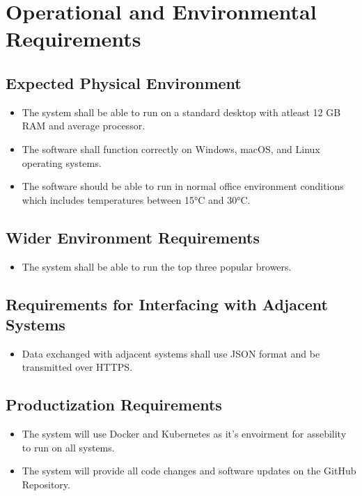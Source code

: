 \documentclass[12pt]{article}
\begin{document}
\section{Operational and Environmental Requirements}
\subsection{Expected Physical Environment}
\begin{itemize}
    \item The system shall be able to run on a standard desktop with atleast 12 GB RAM and average processor.
    \item The software shall function correctly on Windows, macOS, and Linux operating systems.
    \item The software should be able to run in normal office environment conditions which includes temperatures between 15°C and 30°C. 
\end{itemize}

\subsection{Wider Environment Requirements}

\begin{itemize}
    \item The system shall be able to run the top three popular browers.
\end{itemize}


\subsection{Requirements for Interfacing with Adjacent Systems}

\begin{itemize}
    \item Data exchanged with adjacent systems shall use JSON format and be transmitted over HTTPS.
\end{itemize}

\subsection{Productization Requirements}
\begin{itemize}
    \item The system will use Docker and Kubernetes as it's envoirment for assebility to run on all systems.
    \item The system will provide all code changes and software updates on the GitHub Repository. 
\end{itemize}
\end{document}
